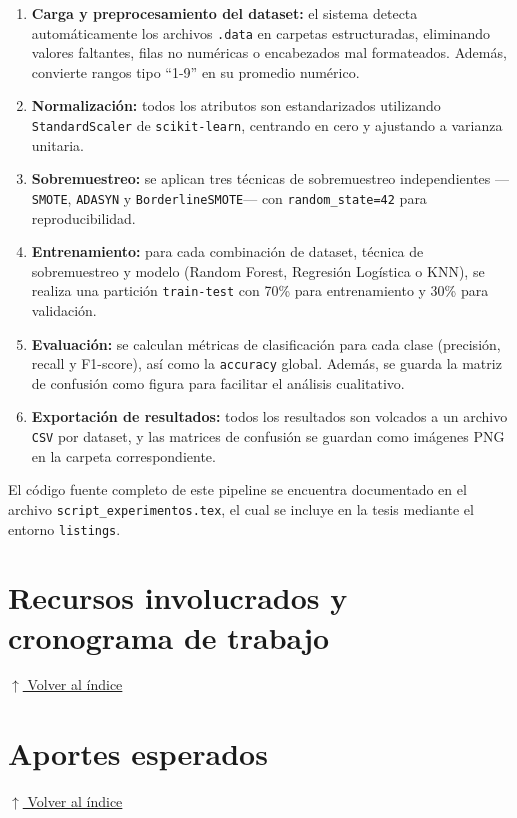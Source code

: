 \documentclass[12pt,a4paper]{article}
\begin{document}
\begin{enumerate}
    \item \textbf{Carga y preprocesamiento del dataset:} el sistema detecta automáticamente los archivos \texttt{.data} en carpetas estructuradas, eliminando valores faltantes, filas no numéricas o encabezados mal formateados. Además, convierte rangos tipo ``1-9'' en su promedio numérico.
    
    \item \textbf{Normalización:} todos los atributos son estandarizados utilizando \texttt{StandardScaler} de \texttt{scikit-learn}, centrando en cero y ajustando a varianza unitaria.
    
    \item \textbf{Sobremuestreo:} se aplican tres técnicas de sobremuestreo independientes —\texttt{SMOTE}, \texttt{ADASYN} y \texttt{BorderlineSMOTE}— con \texttt{random\_state=42} para reproducibilidad.
    
    \item \textbf{Entrenamiento:} para cada combinación de dataset, técnica de sobremuestreo y modelo (Random Forest, Regresión Logística o KNN), se realiza una partición \texttt{train-test} con 70\% para entrenamiento y 30\% para validación.
    
    \item \textbf{Evaluación:} se calculan métricas de clasificación para cada clase (precisión, recall y F1-score), así como la \texttt{accuracy} global. Además, se guarda la matriz de confusión como figura para facilitar el análisis cualitativo.
    
    \item \textbf{Exportación de resultados:} todos los resultados son volcados a un archivo \texttt{CSV} por dataset, y las matrices de confusión se guardan como imágenes PNG en la carpeta correspondiente.
\end{enumerate}

El código fuente completo de este pipeline se encuentra documentado en el archivo \texttt{script\_experimentos.tex}, el cual se incluye en la tesis mediante el entorno \texttt{listings}.


\section{Recursos involucrados y cronograma de trabajo} \noindent\hyperlink{toc}{\small$\uparrow$ Volver al índice}

\section{Aportes esperados} \noindent\hyperlink{toc}{\small$\uparrow$ Volver al índice}
\end{document}
